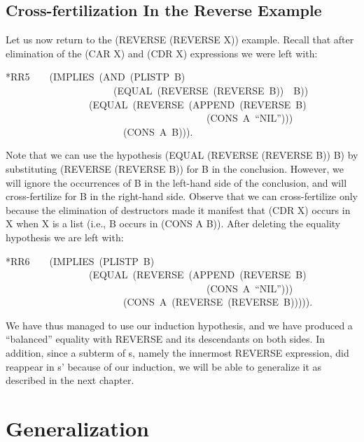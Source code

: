 \documentclass[11pt]{book}
\newenvironment{pubasis}{\begin{flushleft}\ttfamily\small}{\normalsize\rmfamily\end{flushleft}}
\newcommand{\pubdefaulttextsize}{\large}
\begin{document}
\section{Cross-fertilization In the Reverse Example}
\pubdefaulttextsize
Let us now return to the (REVERSE (REVERSE X)) example.
Recall that after elimination of the (CAR X) and (CDR X) expressions
we were left with:
\begin{pubasis}
*RR5~~~~(IMPLIES~(AND~(PLISTP~B)\\
~~~~~~~~~~~~~~~~~~~~~~(EQUAL~(REVERSE~(REVERSE~B))~~B))\\
~~~~~~~~~~~~~~~~~(EQUAL~(REVERSE~(APPEND~(REVERSE~B)\\
~~~~~~~~~~~~~~~~~~~~~~~~~~~~~~~~~~~~~~~~~(CONS~A~``NIL'')))\\
~~~~~~~~~~~~~~~~~~~~~~~~(CONS~A~B))).\\
\end{pubasis}
Note that we can use the hypothesis (EQUAL (REVERSE (REVERSE B)) B) by
substituting (REVERSE (REVERSE B)) for B in the conclusion.  However,
we will ignore the occurrences of B in the left-hand side of
the conclusion, and will cross-fertilize for B in the right-hand side.
Observe that we can cross-fertilize only because the elimination of destructors
made it manifest that (CDR X) occurs in X when X is a list (i.e., B occurs
in (CONS A B)).  After deleting the equality hypothesis we are
left with:
\begin{pubasis}
*RR6~~~~(IMPLIES~(PLISTP~B)\\
~~~~~~~~~~~~~~~~~(EQUAL~(REVERSE~(APPEND~(REVERSE~B)\\
~~~~~~~~~~~~~~~~~~~~~~~~~~~~~~~~~~~~~~~~~(CONS~A~``NIL'')))\\
~~~~~~~~~~~~~~~~~~~~~~~~(CONS~A~(REVERSE~(REVERSE~B))))).\\
\end{pubasis}
We have thus managed to use our induction hypothesis, and we have
produced a ``balanced'' equality with REVERSE and its descendants on
both sides.  In addition, since a subterm of s, namely the innermost
REVERSE expression, did reappear in s' because of our induction, we
will be able to generalize it as described in the next chapter.
\chapter{Generalization}
\label{SECGENERALIZATION}
\pubdefaulttextsize
\end{document}
